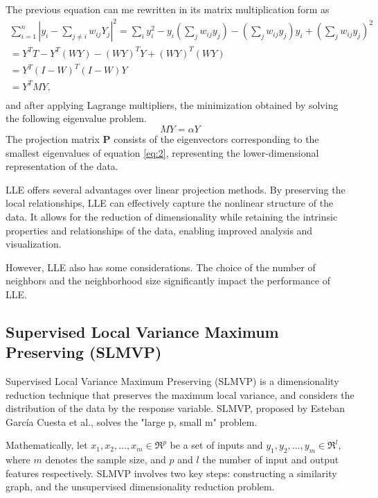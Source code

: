 The previous equation can me rewritten in its matrix multiplication form as
\begin{multline}
    \sum^n_{i=1} |y_i - \sum_{j \neq i} w_{ij} Y_j |^2 = \sum_i y_i^2 - y_i (\sum_j w_{ij}y_j) - (\sum_j w_{ij}y_j)y_i + (\sum_j w_{ij}y_j)^2 \\
    = Y^T T - Y^T (WY) - (WY)^T Y + (WY)^T (WY) \\
    = Y^T (I - W)^T (I-W)Y \\
    = Y^T M Y, \\
\end{multline}
and after applying Lagrange multipliers, the minimization obtained by solving the following eigenvalue problem.
\begin{equation} \label{eq:2}
    MY = \alpha Y
\end{equation}
The projection matrix $\mathbf{P}$ consists of the eigenvectors corresponding to the smallest eigenvalues of equation \ref{eq:2}, representing the lower-dimensional representation of the data.

LLE offers several advantages over linear projection methods. By preserving the local relationships, LLE can effectively capture the nonlinear structure of the data. It allows for the reduction of dimensionality while retaining the intrinsic properties and relationships of the data, enabling improved analysis and visualization.

However, LLE also has some considerations. The choice of the number of neighbors and the neighborhood size significantly impact the performance of LLE.

\subsection{Supervised Local Variance Maximum Preserving (SLMVP)}
Supervised Local Variance Maximum Preserving (SLMVP) \cite{slmvp} is a dimensionality reduction technique that preserves the maximum local variance, and considers the distribution of the data by the response variable. SLMVP, proposed by Esteban García Cuesta et al., solves the "large p, small m" problem.

Mathematically, let $x_1, x_2, ..., x_m \in \mathfrak{R}^p$ be a set of inputs and $y_1, y_2, ..., y_m \in \mathfrak{R}^l$, where $m$ denotes the sample size, and $p$ and $l$ the number of input and output features respectively. SLMVP involves two key steps: constructing a similarity graph, and the unsupervised dimensionality reduction problem.

